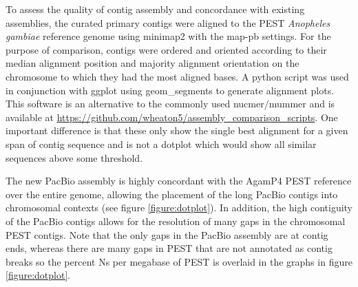 \par{
To assess the quality of contig assembly and concordance with existing assemblies, the curated primary contigs were aligned to the PEST \textit{Anopheles gambiae} reference genome \cite{PEST}\cite{PEST2} using minimap2 with the map-pb settings\cite{minimap2}. For the purpose of comparison, contigs were ordered and oriented according to their median alignment position and majority alignment orientation on the chromosome to which they had the most aligned bases. A python script was used in conjunction with ggplot using geom\_segments to generate alignment plots. This software is an alternative to the commonly used nucmer/mummer\cite{mummer} and is available at \url{https://github.com/wheaton5/assembly\_comparison\_scripts}. One important difference is that these only show the single best alignment for a given span of contig sequence and is not a dotplot which would show all similar sequences above some threshold.
} 

\par{
The new PacBio assembly is highly concordant with the AgamP4 PEST reference over the entire genome, allowing the placement of the long PacBio contigs into chromosomal contexts (see figure \ref{figure:dotplot}). In addition, the high contiguity of the PacBio contigs allows for the resolution of many gaps in the chromosomal PEST contigs. Note that the only gaps in the PacBio assembly are at contig ends, whereas there are many gaps in PEST that are not annotated as contig breaks so the percent Ns per megabase of PEST is overlaid in the graphs in figure \ref{figure:dotplot}. 
}

